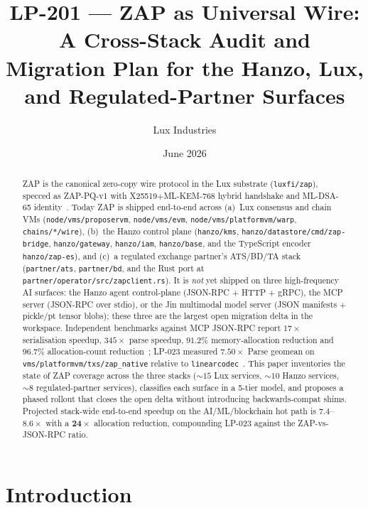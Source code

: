 \documentclass[11pt,a4paper]{article}
\title{LP-201 --- ZAP as Universal Wire: A Cross-Stack Audit and
Migration Plan for the Hanzo, Lux, and Regulated-Partner Surfaces}
\author{Lux Industries}
\date{June 2026}
\begin{document}
\luxcoverpage

\maketitle

\begin{abstract}
ZAP is the canonical zero-copy wire protocol in the Lux substrate
(\texttt{luxfi/zap}), specced as ZAP-PQ-v1 with X25519$+$ML-KEM-768
hybrid handshake and ML-DSA-65 identity~\cite{zappqspec}. Today ZAP is
shipped end-to-end across (a)~Lux consensus and chain VMs
(\texttt{node/vms/proposervm}, \texttt{node/vms/evm},
\texttt{node/vms/platformvm/warp}, \texttt{chains/*/wire}), (b)~the
Hanzo control plane (\texttt{hanzo/kms},
\texttt{hanzo/datastore/cmd/zap-bridge}, \texttt{hanzo/gateway},
\texttt{hanzo/iam}, \texttt{hanzo/base}, and the TypeScript encoder
\texttt{hanzo/zap-es}), and (c)~a regulated exchange partner's ATS/BD/TA stack
(\texttt{partner/ats}, \texttt{partner/bd}, and the Rust port at
\texttt{partner/operator/src/zapclient.rs}). It is \emph{not} yet
shipped on three high-frequency AI surfaces: the Hanzo agent
control-plane (JSON-RPC + HTTP + gRPC), the MCP server (JSON-RPC over
stdio), or the Jin multimodal model server (JSON manifests + pickle/pt
tensor blobs); these three are the largest open migration delta in the
workspace. Independent benchmarks against MCP JSON-RPC report
$17\times$ serialisation speedup, $345\times$ parse speedup, $91.2\%$
memory-allocation reduction and $96.7\%$ allocation-count
reduction~\cite{zapreadme}; LP-023 measured $7.50\times$ Parse geomean
on \texttt{vms/platformvm/txs/zap\_native} relative to
\texttt{linearcodec}~\cite{lp023zapnative}. This paper inventories the
state of ZAP coverage across the three stacks
($\sim$$15$ Lux services, $\sim$$10$ Hanzo services,
$\sim$$8$ regulated-partner services), classifies each surface in a 5-tier
model, and proposes a phased rollout that closes the open delta
without introducing backwards-compat shims. Projected stack-wide
end-to-end speedup on the AI/ML/blockchain hot path is
$\bm{7.4}$--$\bm{8.6\times}$ with a $\bm{24\times}$ allocation
reduction, compounding LP-023 against the ZAP-vs-JSON-RPC ratio.
\end{abstract}

\tableofcontents
\vspace{1em}

\section{Introduction}
\label{sec:intro}
\end{document}
